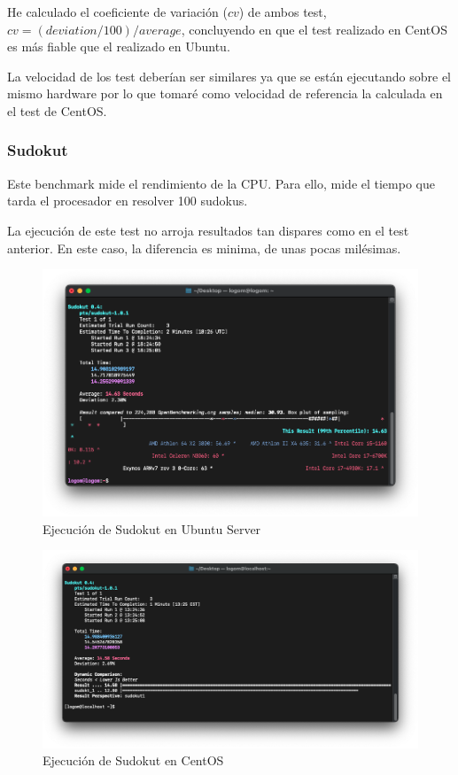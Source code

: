 He calculado el coeficiente de variación ($cv$) de ambos test, $cv = (deviation / 100) / average$, concluyendo en que el test realizado en CentOS es más fiable que el realizado en Ubuntu.

La velocidad de los test deberían ser similares ya que se están ejecutando sobre el mismo hardware por lo que tomaré como velocidad de referencia la calculada en el test de CentOS.

\subsubsection{Sudokut}
Este benchmark mide el rendimiento de la CPU. Para ello, mide el tiempo que tarda el procesador en resolver 100 sudokus.

La ejecución de este test no arroja resultados tan dispares como en el test anterior. En este caso, la diferencia es minima, de unas pocas milésimas.

\begin{figure}[H]
    \centering
    \includegraphics[scale=0.5]{images/sudokut_ubuntu.png}
    \caption{Ejecución de Sudokut en Ubuntu Server}
    \label{fig:sudokut_ubuntu}
\end{figure}

\begin{figure}[H]
    \centering
    \includegraphics[scale=0.4]{images/sudokut_centos.png}
    \caption{Ejecución de Sudokut en CentOS}
    \label{fig:sudokut_centos}
\end{figure}

